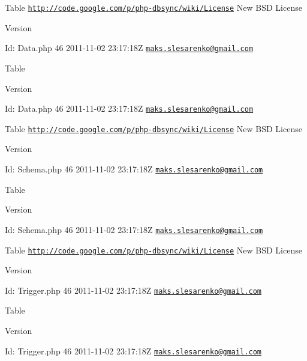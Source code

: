 Table  \href{http://code.google.com/p/php-dbsync/wiki/License}{\tt http://code.google.com/p/php-\/dbsync/wiki/License} New BSD License \begin{DoxyVersion}{Version}

\end{DoxyVersion}
\begin{DoxyParagraph}{Id:}
Data.php 46 2011-\/11-\/02 23:17:18Z \href{mailto:maks.slesarenko@gmail.com}{\tt maks.slesarenko@gmail.com} 
\end{DoxyParagraph}


Table \begin{DoxyVersion}{Version}

\end{DoxyVersion}
\begin{DoxyParagraph}{Id:}
Data.php 46 2011-\/11-\/02 23:17:18Z \href{mailto:maks.slesarenko@gmail.com}{\tt maks.slesarenko@gmail.com} 
\end{DoxyParagraph}


Table  \href{http://code.google.com/p/php-dbsync/wiki/License}{\tt http://code.google.com/p/php-\/dbsync/wiki/License} New BSD License \begin{DoxyVersion}{Version}

\end{DoxyVersion}
\begin{DoxyParagraph}{Id:}
Schema.php 46 2011-\/11-\/02 23:17:18Z \href{mailto:maks.slesarenko@gmail.com}{\tt maks.slesarenko@gmail.com} 
\end{DoxyParagraph}


Table \begin{DoxyVersion}{Version}

\end{DoxyVersion}
\begin{DoxyParagraph}{Id:}
Schema.php 46 2011-\/11-\/02 23:17:18Z \href{mailto:maks.slesarenko@gmail.com}{\tt maks.slesarenko@gmail.com} 
\end{DoxyParagraph}


Table  \href{http://code.google.com/p/php-dbsync/wiki/License}{\tt http://code.google.com/p/php-\/dbsync/wiki/License} New BSD License \begin{DoxyVersion}{Version}

\end{DoxyVersion}
\begin{DoxyParagraph}{Id:}
Trigger.php 46 2011-\/11-\/02 23:17:18Z \href{mailto:maks.slesarenko@gmail.com}{\tt maks.slesarenko@gmail.com} 
\end{DoxyParagraph}


Table \begin{DoxyVersion}{Version}

\end{DoxyVersion}
\begin{DoxyParagraph}{Id:}
Trigger.php 46 2011-\/11-\/02 23:17:18Z \href{mailto:maks.slesarenko@gmail.com}{\tt maks.slesarenko@gmail.com} 
\end{DoxyParagraph}
